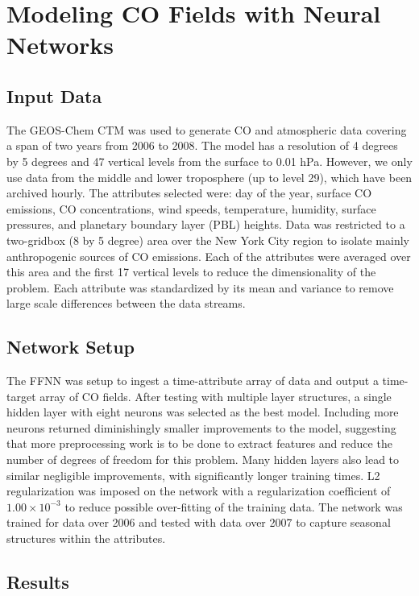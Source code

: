\chapter{Modeling CO Fields with Neural Networks}
\label{nnco}
\section{Input Data}

The GEOS-Chem CTM was used to generate CO and atmospheric data covering a span of two years from 2006 to 2008. The model has a resolution of 4 degrees by 5 degrees and 47 vertical levels from the surface to 0.01 hPa. However, we only use data from the middle and lower troposphere (up to level 29), which have been archived hourly. The attributes selected were: day of the year, surface CO emissions, CO concentrations, wind speeds, temperature, humidity, surface pressures, and planetary boundary layer (PBL) heights. Data was restricted to a two-gridbox (8 by 5 degree) area over the New York City region to isolate mainly anthropogenic sources of CO emissions. Each of the attributes were averaged over this area and the first 17 vertical levels to reduce the dimensionality of the problem. Each attribute was standardized by its mean and variance to remove large scale differences between the data streams.

\section{Network Setup}

The FFNN was setup to ingest a time-attribute array of data and output a time-target array of CO fields. After testing with multiple layer structures, a single hidden layer with eight neurons was selected as the best model. Including more neurons returned diminishingly smaller improvements to the model, suggesting that more preprocessing work is to be done to extract features and reduce the number of degrees of freedom for this problem. Many hidden layers  also lead to similar negligible improvements, with significantly longer training times. L2 regularization was imposed on the network with a regularization coefficient of $1.00\times10^{-3}$ to reduce possible over-fitting of the training data. The network was trained for data over 2006 and tested with data over 2007 to capture seasonal structures within the attributes. 

\section{Results}

